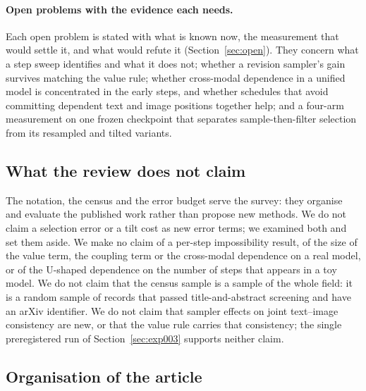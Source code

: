 \paragraph{Open problems with the evidence each needs.}
Each open problem is stated with what is known now, the measurement that would settle it, and what would refute it (Section~\ref{sec:open}). They concern what a step sweep identifies and what it does not; whether a revision sampler's gain survives matching the value rule; whether cross-modal dependence in a unified model is concentrated in the early steps, and whether schedules that avoid committing dependent text and image positions together help; and a four-arm measurement on one frozen checkpoint that separates sample-then-filter selection from its resampled and tilted variants. %

\subsection{What the review does not claim}
\label{sec:intro-notclaimed}

The notation, the census and the error budget serve the survey: they organise and evaluate the published work rather than propose new methods. We do not claim a selection error or a tilt cost as new error terms; we examined both and set them aside. %
We make no claim of a per-step impossibility result, of the size of the value term, the coupling term or the cross-modal dependence on a real model, or of the U-shaped dependence on the number of steps that appears in a toy model. %
We do not claim that the census sample is a sample of the whole field: it is a random sample of records that passed title-and-abstract screening and have an arXiv identifier. We do not claim that sampler effects on joint text--image consistency are new, or that the value rule carries that consistency; the single preregistered run of Section~\ref{sec:exp003} supports neither claim. %

\subsection{Organisation of the article}
\label{sec:intro-guide}

